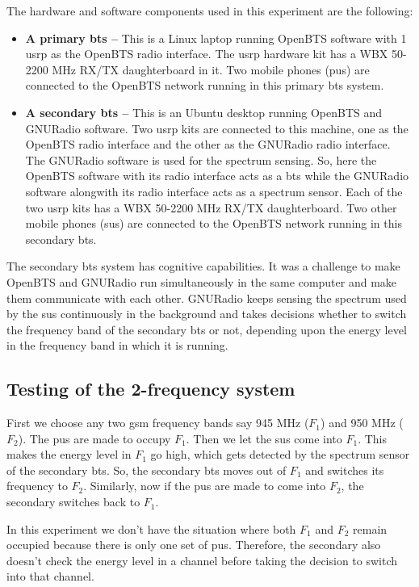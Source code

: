 The hardware and software components used in this experiment are the 
following:
\begin{itemize}
    \item \textbf{A primary \gls{bts} --} This is a Linux laptop running OpenBTS
    software with 1 \gls{usrp} as the OpenBTS radio interface. The \gls{usrp} hardware kit
    has a WBX 50-2200 MHz RX/TX daughterboard in it. Two mobile phones 
    (\glspl{pu}) are connected to the OpenBTS network running in this 
    primary \gls{bts} system.
    \item \textbf{A secondary \gls{bts} --} This is an Ubuntu desktop running
    OpenBTS and GNURadio software. Two \gls{usrp} kits are connected to this
    machine, one as the OpenBTS radio interface and the other as the GNURadio
    radio interface. The GNURadio software is used for the spectrum sensing. 
    So, here the OpenBTS software with its radio interface acts as a \gls{bts}
    while the GNURadio software alongwith its radio
    interface acts as a spectrum sensor. Each of the two \gls{usrp} kits has a
    WBX 50-2200 MHz RX/TX daughterboard. Two other mobile phones (\glspl{su})
    are connected to the OpenBTS network running in this secondary \gls{bts}.
\end{itemize}

The secondary \gls{bts} system has cognitive capabilities. It was a challenge to 
make OpenBTS and GNURadio run simultaneously in the same computer and make 
them communicate with each other. GNURadio keeps sensing the spectrum used by
the \glspl{su} continuously in the background and takes decisions whether
to switch the frequency band of the secondary \gls{bts} or not, depending upon the 
energy level in the frequency band in which it is running.

\subsection{Testing of the 2-frequency system}
First we choose any two \gls{gsm} frequency bands say 945 MHz ($F_1$) and 950 MHz 
($F_2$). The \glspl{pu} are made to occupy $F_1$. Then we let the \glspl{su}
come into $F_1$. This makes the energy level in $F_1$ go high, which 
gets detected by the spectrum sensor of the secondary \gls{bts}. So, the secondary 
\gls{bts} moves out of $F_1$ and switches its frequency to $F_2$. Similarly, now if 
the \glspl{pu} are made to come into $F_2$, the secondary switches back to 
$F_1$.

In this experiment we don't have the situation where both $F_1$ and $F_2$ 
remain occupied because there is only one set of \glspl{pu}. Therefore, the 
secondary also doesn't check the energy level in a channel before taking the
decision to switch into that channel.

